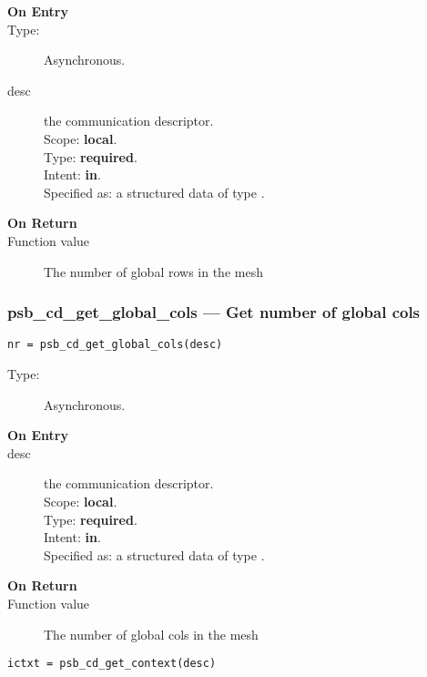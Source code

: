 \begin{description}
\item[\bf On Entry]
\item[Type:] Asynchronous.
\item[desc] the communication descriptor.\\
Scope: {\bf local}.\\
Type: {\bf required}.\\
Intent: {\bf in}.\\
Specified as: a structured data of type \descdata.
\end{description}

\begin{description}
\item[\bf On Return]
\item[Function value] The number of global rows in the mesh
\end{description}

\subsubsection*{psb\_cd\_get\_global\_cols --- Get number of global cols}

\begin{verbatim}
nr = psb_cd_get_global_cols(desc)
\end{verbatim}

\begin{description}
\item[Type:] Asynchronous.
\item[\bf On Entry]
\item[desc] the communication descriptor.\\
Scope: {\bf local}.\\
Type: {\bf required}.\\
Intent: {\bf in}.\\
Specified as: a structured data of type \descdata.
\end{description}

\begin{description}
\item[\bf On Return]
\item[Function value] The number of global cols in the mesh
\end{description}


\begin{verbatim}
ictxt = psb_cd_get_context(desc)
\end{verbatim}

